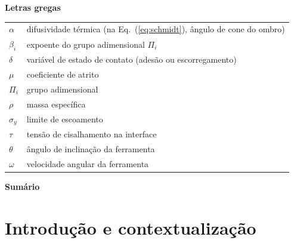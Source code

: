 \documentclass[12pt,openany]{report}
\begin{document}
\begin{singlespace}
\vspace{0.6cm}
\noindent\textbf{Letras gregas}\\[4pt]
\begin{tabular}{@{}p{2.2cm}p{12.5cm}@{}}
$\alpha$ & difusividade térmica (na Eq.~(\ref{eq:schmidt}), ângulo de cone do ombro) \\
$\beta_i$ & expoente do grupo adimensional $\Pi_i$ \\
$\delta$ & variável de estado de contato (adesão ou escorregamento) \\
$\mu$ & coeficiente de atrito \\
$\Pi_i$ & grupo adimensional \\
$\rho$ & massa específica \\
$\sigma_y$ & limite de escoamento \\
$\tau$ & tensão de cisalhamento na interface \\
$\theta$ & ângulo de inclinação da ferramenta \\
$\omega$ & velocidade angular da ferramenta \\
\end{tabular}
\end{singlespace}
\newpage


\begin{center}
    {\fontsize{18}{22}\selectfont\bfseries Sumário\par}
\end{center}
\vspace{1.5cm}

\begin{singlespace}
\makeatletter
{}
\makeatother
\end{singlespace}

\newpage
{}\setcounter{paginaspre}{\value{page}}
\setcounter{page}{\value{paginaspre}}

\chapter{Introdução e contextualização}
\end{document}
